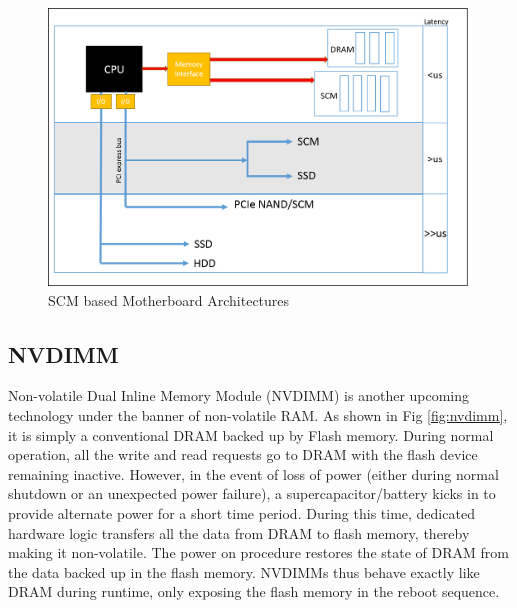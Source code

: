 \begin{figure}[H]
  \centering
  \includegraphics[scale=0.7]{figures/new_mem_arch.png}
  \caption[SCM based Motherboard Architectures]{SCM based Motherboard Architectures \cite{mother_archi}}
  \label{fig:new_arch}
\end{figure}

\subsection{NVDIMM}
Non-volatile Dual Inline Memory Module (NVDIMM) \cite{nvdimm} is another upcoming technology under the banner of non-volatile RAM. As shown in Fig \ref{fig:nvdimm}, it is simply a conventional DRAM backed up by Flash memory. During normal operation, all the write and read requests go to DRAM with the flash device remaining inactive. However, in the event of loss of power (either during normal shutdown or an unexpected power failure), a supercapacitor/battery kicks in to provide alternate power for a short time period. During this time, dedicated hardware logic transfers all the data from DRAM to flash memory, thereby making it non-volatile. The power on procedure restores the state of DRAM from the data backed up in the flash memory. NVDIMMs thus behave exactly like DRAM during runtime, only exposing the flash memory in the reboot sequence. 

\setlength{\belowcaptionskip}{-10pt}

